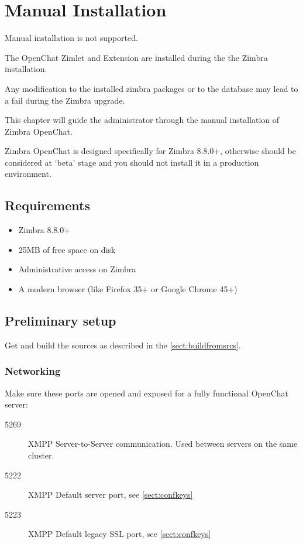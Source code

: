 \section{Manual Installation}

\begin{warning}
    Manual installation is not supported.

    The OpenChat Zimlet and Extension are installed during the the Zimbra installation.

    Any modification to the installed zimbra packages or to the database may lead to a fail during the Zimbra upgrade.
\end{warning}

This chapter will guide the administrator through the manual installation of Zimbra OpenChat.

Zimbra OpenChat is designed specifically for Zimbra 8.8.0+, otherwise should be considered at `beta'
stage and you should not install it in a production environment.

\subsection{Requirements}
    \begin{itemize}
        \item Zimbra 8.8.0+
        \item 25MB of free space on disk
        \item Administrative access on Zimbra
        \item A modern browser (like Firefox 35+ or Google Chrome 45+)
    \end{itemize}

\subsection{Preliminary setup}

    Get and build the sources as described in the \autoref{sect:buildfromsrcs}.

\subsubsection{Networking}

    Make sure these ports are opened and exposed for a fully functional OpenChat server:
    \begin{description}
        \item [5269] XMPP Server-to-Server communication. Used between servers on the same cluster.
        \item [5222] XMPP Default server port, see \autoref{sect:confkeys}
        \item [5223] XMPP Default legacy SSL port, see \autoref{sect:confkeys}
    \end{description}

